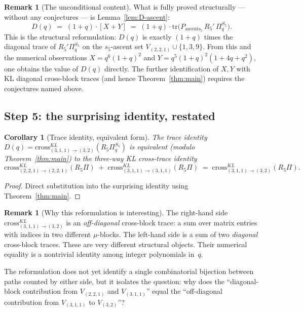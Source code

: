 \documentclass[11pt]{article}
\newtheorem{corollary}[theorem]{Corollary}
\theoremstyle{definition}
\newtheorem{remark}[theorem]{Remark}
\begin{document}
\begin{remark}[The unconditional content]
What is fully proved structurally — without any conjectures — is Lemma~\ref{lem:D-ascent}:
\[
D(q) \;=\; (1+q)\cdot[X + Y] \;=\; (1+q)\cdot \mathrm{tr}\bigl(P_{\mathrm{ascents}_5}\, R_5'\, \Pi_q^{S_5}\bigr).
\]
This is the structural reformulation: $D(q)$ is exactly $(1+q)$ times the diagonal trace of $R_5'\Pi_q^{S_5}$ on the $s_5$-ascent set $V_{(2,2,1)} \cup \{1, 3, 9\}$. From this and the numerical observations $X = q^6(1+q)^2$ and $Y = q^5(1+q)^2(1+4q+q^2)$, one obtains the value of $D(q)$ directly. The further identification of $X, Y$ with KL diagonal cross-block traces (and hence Theorem~\ref{thm:main}) requires the conjectures named above.
\end{remark}

\subsection*{Step 5: the surprising identity, restated}

\begin{corollary}[Trace identity, equivalent form]\label{cor:surprise}
The trace identity $D(q) = \mathrm{cross}_{(3,1,1)\to(3,2)}^{KL}(R_5 \Pi_q^{S_5})$
is equivalent (modulo Theorem~\ref{thm:main}) to the three-way KL cross-trace
identity
\[
\mathrm{cross}_{(2,2,1)\to(2,2,1)}^{KL}(R_5\Pi) \;+\; \mathrm{cross}_{(3,1,1)\to(3,1,1)}^{KL}(R_5\Pi) \;=\; \mathrm{cross}_{(3,1,1)\to(3,2)}^{KL}(R_5\Pi).
\]
\end{corollary}

\begin{proof}
Direct substitution into the surprising identity using Theorem~\ref{thm:main}.
\end{proof}

\begin{remark}[Why this reformulation is interesting]\label{rem:interp}
The right-hand side $\mathrm{cross}_{(3,1,1)\to(3,2)}^{KL}$ is an
\emph{off-diagonal} cross-block trace: a sum over matrix entries with
indices in two different $\mu$-blocks. The left-hand side is a sum of
two \emph{diagonal} cross-block traces. These are very different structural
objects. Their numerical equality is a nontrivial identity among integer
polynomials in~$q$.

The reformulation does not yet identify a single combinatorial bijection
between paths counted by either side, but it isolates the question: why does
the ``diagonal-block contribution from $V_{(2,2,1)}$ and $V_{(3,1,1)}$'' equal
the ``off-diagonal contribution from $V_{(3,1,1)}$ to $V_{(3,2)}$''?
\end{remark}
\end{document}
